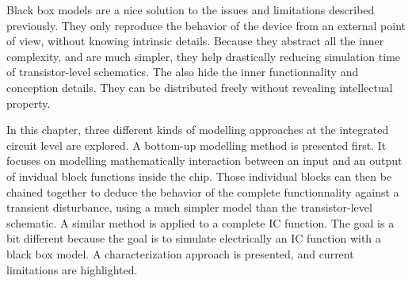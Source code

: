 Black box models are a nice solution to the issues and limitations described previously.
They only reproduce the behavior of the device from an external point of view, without knowing intrinsic details.
Because they abstract all the inner complexity, and are much simpler, they help drastically reducing simulation time of transistor-level schematics.
The also hide the inner functionnality and conception details.
They can be distributed freely without revealing intellectual property.


In this chapter, three different kinds of modelling approaches at the integrated circuit level are explored.
A bottom-up modelling method is presented first.
It focuses on modelling mathematically interaction between an input and an output of invidual block functions inside the chip.
Those individual blocks can then be chained together to deduce the behavior of the complete functionnality against a transient disturbance, using a much simpler model than the transistor-level schematic.
A similar method is applied to a complete IC function.
The goal is a bit different because the goal is to simulate electrically an IC function with a black box model.
A characterization approach is presented, and current limitations are highlighted.
